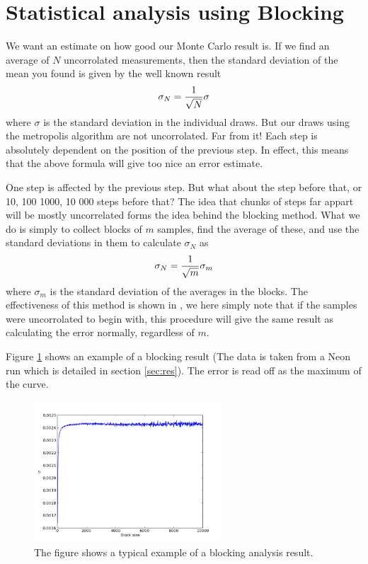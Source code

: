 \documentclass[aps,prc,twocolumn,floatfix]{revtex4}
\begin{document}
\section{Statistical analysis using Blocking}
\label{sec:block}
 We want an estimate on how good our Monte Carlo result is. If we find an average of $N$ uncorrolated measurements, then the standard deviation of the mean you found is given by the well known result 
 \begin{equation}
  \sigma_N = {1 \over \sqrt{N}}\sigma
 \end{equation}
where $\sigma$ is the standard deviation in the individual draws. But our draws using the metropolis algorithm are not uncorrolated. Far from it! Each step is absolutely dependent on the position of the previous step. In effect, this means that the above formula will give too nice an error estimate. 

One step is affected by the previous step. But what about the step before that, or 10, 100 1000, 10 000 steps before that? The idea that chunks of steps far appart will be mostly uncorrelated forms the idea behind the blocking method. What we do is simply to collect blocks of $m$ samples, find the average of these, and use the standard deviations in them to calculate $\sigma_N$ as 
\begin{equation}
 \sigma_N = {1 \over \sqrt{m}} \sigma_m
\end{equation}
where $\sigma_m$ is the standard deviation of the averages in the blocks. The effectiveness of this method is shown in \cite{flyvberg89}, we here simply note that if the samples were uncorrolated to begin with, this procedure will give the same result as calculating the error normally, regardless of $m$. 
 
Figure \ref{fig:block} shows an example of a blocking result (The data is taken from a Neon run which is detailed in section \ref{sec:res}). The error is read off as the maximum of the curve.

  \begin{figure}
\centering
\includegraphics[width=7cm]{figures/blockingex.png}
\caption{\label{fig:block} The figure shows a typical example of a blocking analysis result.}
\end{figure}
\end{document}
